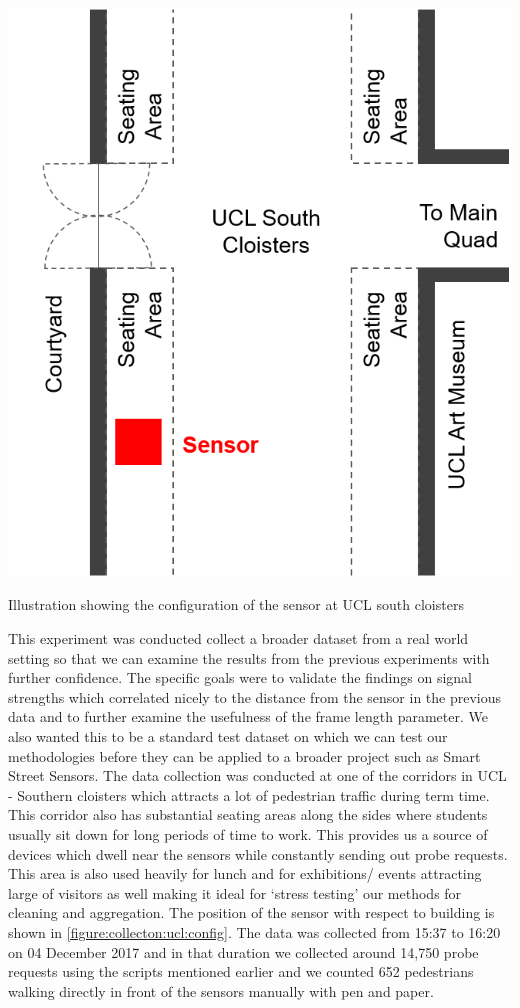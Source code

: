 \begin{marginfigure}[4.5cm]
  \forcerectofloat
  \includegraphics[trim={5 5 5 5},clip]{images/south-cloisters.png}
  \caption{Illustration showing the configuration of the sensor at UCL south cloisters}
  \label{figure:collection:ucl:config}
\end{marginfigure}

This experiment was conducted collect a broader dataset from a real world setting so that we can examine the results from the previous experiments with further confidence.
The specific goals were to validate the findings on signal strengths which correlated nicely to the distance from the sensor in the previous data and to further examine the usefulness of the frame length parameter.
We also wanted this to be a standard test dataset on which we can test our methodologies before they can be applied to a broader project such as Smart Street Sensors.
The data collection was conducted at one of the corridors in UCL - Southern cloisters which attracts a lot of pedestrian traffic during term time.
This corridor also has substantial seating areas along the sides where students usually sit down for long periods of time to work.
This provides us a source of devices which dwell near the sensors while constantly sending out probe requests.
This area is also used heavily for lunch and for exhibitions/ events attracting  large of visitors as well making it ideal for `stress testing' our methods for cleaning and aggregation.
The position of the sensor with respect to building is shown in \ref{figure:collecton:ucl:config}.
The data was collected from 15:37 to 16:20 on 04 December 2017 and in that duration we collected around 14,750 probe requests using the scripts mentioned earlier and we counted 652 pedestrians walking directly in front of the sensors manually with pen and paper.

